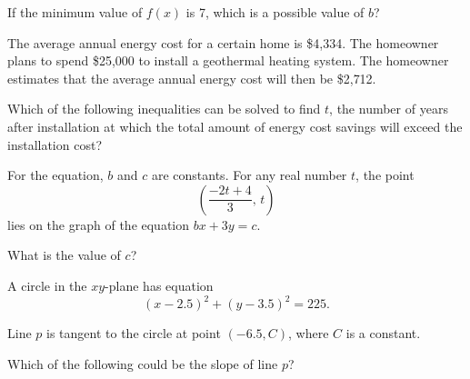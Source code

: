 If the minimum value of \(f(x)\) is 7, which is a possible value of \(b\)?

\vspace{0.75em}


\vspace{2em}
\newpage

\noindent\markforreview
\vspace{1em}

The average annual energy cost for a certain home is \$4{,}334. The homeowner plans to spend \$25{,}000 to install a geothermal heating system. The homeowner estimates that the average annual energy cost will then be \$2{,}712.

Which of the following inequalities can be solved to find \(t\), the number of years after installation at which the total amount of energy cost savings will exceed the installation cost?

\vspace{0.75em}


\vspace{2em}
\newpage

\noindent\markforreview
\vspace{1em}

For the equation, \(b\) and \(c\) are constants. For any real number \(t\), the point
\[
\left(\frac{-2t + 4}{3},\, t\right)
\]
lies on the graph of the equation \(bx + 3y = c\).

What is the value of \(c\)?

\vspace{0.75em}


\vspace{2em}
\newpage

\noindent\markforreview
\vspace{1em}

A circle in the \(xy\)-plane has equation
\[
(x - 2.5)^2 + (y - 3.5)^2 = 225.
\]

Line \(p\) is tangent to the circle at point \((-6.5, C)\), where \(C\) is a constant.

Which of the following could be the slope of line \(p\)?

